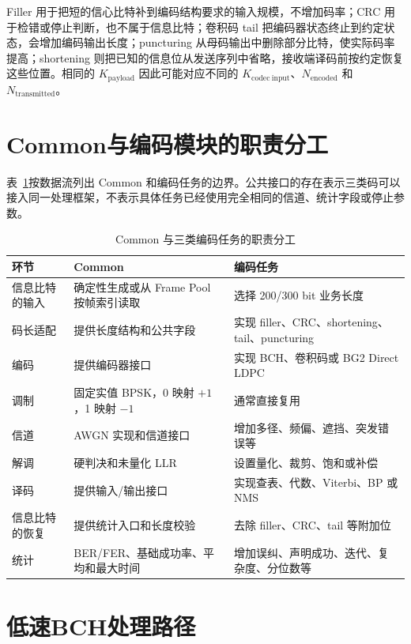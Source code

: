 Filler 用于把短的信心比特补到编码结构要求的输入规模，不增加码率；CRC 用于检错或停止判断，也不属于信息比特；卷积码 tail 把编码器状态终止到约定状态，会增加编码输出长度；puncturing 从母码输出中删除部分比特，使实际码率提高；shortening 则把已知的信息位从发送序列中省略，接收端译码前按约定恢复这些位置。相同的 $K_{\mathrm{payload}}$ 因此可能对应不同的 $K_{\mathrm{codec\ input}}$、$N_{\mathrm{encoded}}$ 和 $N_{\mathrm{transmitted}}$。

\section{Common与编码模块的职责分工}

表~\ref{tab:common-codec-responsibility}按数据流列出 Common 和编码任务的边界。公共接口的存在表示三类码可以接入同一处理框架，不表示具体任务已经使用完全相同的信道、统计字段或停止参数。

\begin{table}[htbp]
  \centering
  \scriptsize
  \caption{Common 与三类编码任务的职责分工}
  \label{tab:common-codec-responsibility}
  \begin{tabular}{p{}p{}p{}}
    \toprule
    环节 & Common & 编码任务 \\
    \midrule
    信息比特的输入 & 确定性生成或从 Frame Pool 按帧索引读取 & 选择 200/300 bit 业务长度 \\
    码长适配 & 提供长度结构和公共字段 & 实现 filler、CRC、shortening、tail、puncturing \\
    编码 & 提供编码器接口 & 实现 BCH、卷积码或 BG2 Direct LDPC \\
    调制 & 固定实值 BPSK，0 映射 $+1$，1 映射 $-1$ & 通常直接复用 \\
    信道 & AWGN 实现和信道接口 & 增加多径、频偏、遮挡、突发错误等 \\
    解调 & 硬判决和未量化 LLR & 设置量化、裁剪、饱和或补偿 \\
    译码 & 提供输入/输出接口 & 实现查表、代数、Viterbi、BP 或 NMS \\
    信息比特的恢复 & 提供统计入口和长度校验 & 去除 filler、CRC、tail 等附加位 \\
    统计 & BER/FER、基础成功率、平均和最大时间 & 增加误纠、声明成功、迭代、复杂度、分位数等 \\
    \bottomrule
  \end{tabular}
\end{table}

\section{低速BCH处理路径}

